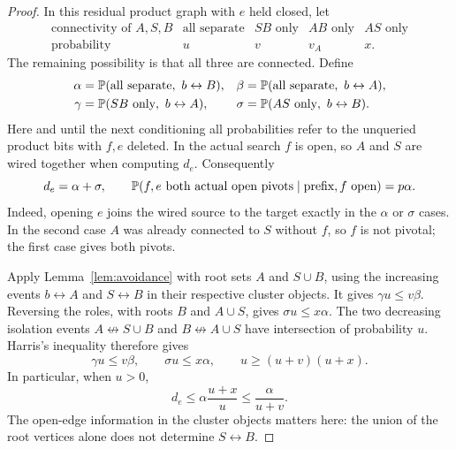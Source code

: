 \begin{proof}
In this residual product graph with $e$ held closed, let
\[
 \begin{array}{c|cccc}
 \text{connectivity of }A,S,B
 &\text{all separate}&SB\text{ only}&AB\text{ only}&AS\text{ only}\\ \hline
 \text{probability}&u&v&v_A&x.
 \end{array}
\]
The remaining possibility is that all three are connected. Define
\[
 \begin{aligned}
 \alpha&=\mathbb P(\text{all separate},\ b\leftrightarrow B),&
 \beta&=\mathbb P(\text{all separate},\ b\leftrightarrow A),\\
 \gamma&=\mathbb P(SB\text{ only},\ b\leftrightarrow A),&
 \sigma&=\mathbb P(AS\text{ only},\ b\leftrightarrow B).
 \end{aligned}
\]
Here and until the next conditioning all probabilities refer to the
unqueried product bits with $f,e$ deleted. In the actual search $f$
is open, so $A$ and $S$ are wired together when computing $d_e$.
Consequently
\begin{equation}\label{eq:dfs-partition-pivots}
 d_e=\alpha+\sigma,
 \qquad
 \mathbb P(f,e\text{ both actual open pivots}\mid\text{prefix},f\text{ open})
 =p\alpha.
\end{equation}
Indeed, opening $e$ joins the wired source to the target exactly in
the $\alpha$ or $\sigma$ cases. In the second case $A$ was already
connected to $S$ without $f$, so $f$ is not pivotal; the first case
gives both pivots.

Apply Lemma~\ref{lem:avoidance} with root sets $A$ and $S\cup B$,
using the increasing events $b\leftrightarrow A$ and
$S\leftrightarrow B$ in their respective cluster objects. It gives
$\gamma u\le v\beta$. Reversing the roles, with roots $B$ and
$A\cup S$, gives $\sigma u\le x\alpha$. The two decreasing isolation
events $A\not\leftrightarrow S\cup B$ and
$B\not\leftrightarrow A\cup S$ have intersection of probability $u$.
Harris's inequality therefore gives
\begin{equation}\label{eq:dfs-isolation-inequalities}
 \gamma u\le v\beta,
 \qquad \sigma u\le x\alpha,
 \qquad u\ge(u+v)(u+x).
\end{equation}
In particular, when $u>0$,
\begin{equation}\label{eq:dfs-pivotal-comparison}
 d_e\le\alpha\frac{u+x}{u}\le\frac\alpha{u+v}.
\end{equation}
The open-edge information in the cluster objects matters here:
the union of the root vertices alone does not determine
$S\leftrightarrow B$.


\end{proof}
